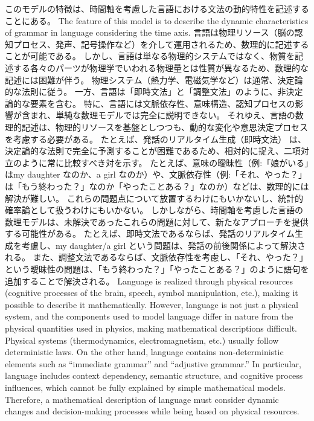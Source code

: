 \documentclass[a4paper,xelatex,ja=standard]{bxjsarticle}
\begin{document}
\ifJPN
このモデルの特徴は、時間軸を考慮した言語における文法の動的特性を記述することにある。
\else
The feature of this model is to describe the dynamic characteristics of grammar in language considering the time axis.
\fi
\ifJPN
言語は物理リソース（脳の認知プロセス、発声、記号操作など）を介して運用されるため、数理的に記述することが可能である。
しかし、言語は単なる物理的システムではなく、物質を記述する各々のパーツが物理学でいわれる物理量とは性質が異なるため、数理的な記述には困難が伴う。
物理システム（熱力学、電磁気学など）は通常、決定論的な法則に従う。
一方、言語は「即時文法」と「調整文法」のように、非決定論的な要素を含む。
特に、言語には文脈依存性、意味構造、認知プロセスの影響が含まれ、単純な数理モデルでは完全に説明できない。
それゆえ、言語の数理的記述は、物理的リソースを基盤としつつも、動的な変化や意思決定プロセスを考慮する必要がある。
たとえば、発話のリアルタイム生成（即時文法） は、決定論的な法則で完全に予測することが困難であるため、相対的に捉え、二項対立のように常に比較すべき対を示す。
たとえば、意味の曖昧性（例:「娘がいる」はmy daughter なのか、a girl なのか）や、文脈依存性（例:「それ、やった？」は「もう終わった？」なのか「やったことある？」なのか）などは、数理的には解決が難しい。
これらの問題点について放置するわけにもいかないし、統計的確率論として扱うわけにもいかない。
しかしながら、時間軸を考慮した言語の数理モデルは、未解決であったこれらの問題に対して、新たなアプローチを提供する可能性がある。
たとえば、即時文法であるならば、発話のリアルタイム生成を考慮し、my daughter/a girl という問題は、発話の前後関係によって解決される。
また、調整文法であるならば、文脈依存性を考慮し、「それ、やった？」という曖昧性の問題は、「もう終わった？」「やったことある？」のように語句を追加することで解決される。
    \else
Language is realized through physical resources (cognitive processes of the brain, speech, symbol manipulation, etc.), making it possible to describe it mathematically.
However, language is not just a physical system, and the components used to model language differ in nature from the physical quantities used in physics, making mathematical descriptions difficult.
Physical systems (thermodynamics, electromagnetism, etc.) usually follow deterministic laws.
On the other hand, language contains non-deterministic elements such as ``immediate grammar'' and ``adjustive grammar.''
In particular, language includes context dependency, semantic structure, and cognitive process influences, which cannot be fully explained by simple mathematical models.
Therefore, a mathematical description of language must consider dynamic changes and decision-making processes while being based on physical resources.
\end{document}
